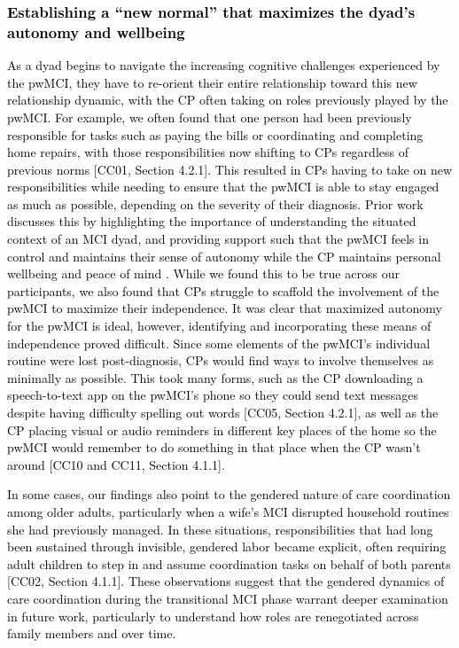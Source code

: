 \documentclass[acmsmall]{acmart}
\begin{document}
\textcolor{black}{\subsubsection{Establishing a “new normal” that maximizes the dyad’s autonomy and wellbeing}
As a dyad begins to navigate the increasing cognitive challenges \textcolor{black}{experienced by the pwMCI}, they have to re-orient their entire relationship toward this new relationship dynamic, with the CP often taking on roles previously played by the pwMCI. For example, we often found that one person had been previously responsible for tasks such as paying the bills or coordinating and completing home repairs, with those responsibilities now shifting to CPs regardless of previous norms \textcolor{black}{[CC01, Section 4.2.1]}. This resulted in CPs having to take on new responsibilities while needing to ensure that the pwMCI is able to stay engaged as much as possible, depending on the severity of their diagnosis. Prior work discusses this by highlighting the importance of understand\textcolor{black}{ing} the situated context of an MCI dyad, and provid\textcolor{black}{ing} support such that the pwMCI feels \textcolor{black}{in control and maintains their sense of autonomy} while the CP maintains personal wellbeing and peace of mind \cite{madjaroff2017narratives}. While we found this to be true across our participants, we also found that CPs struggle to scaffold the involvement of the pwMCI to maximize their independence. It was clear that maximized autonomy for the pwMCI is ideal, however, identifying and incorporating these means of independence proved difficult. Since some elements of the pwMCI’s individual routine were lost post-diagnosis, CPs would find ways to involve themselves as minimally as possible. This took many forms, such as the CP \textcolor{black}{downloading a speech-to-text app on the pwMCI’s phone so they could send text messages despite having difficulty spelling out words [CC05, Section 4.2.1], as well as} the CP placing visual \textcolor{black}{or audio} reminders in different key places of the home so the pwMCI would remember to do something in that place when the CP wasn’t around [CC10 \textcolor{black}{and CC11, Section 4.1.1}].} \textcolor{black}{In some cases, our findings also point to the gendered nature of care coordination among older adults, particularly when a wife’s MCI disrupted household routines she had previously managed. In these situations, responsibilities that had long been sustained through invisible, gendered labor became explicit, often requiring adult children to step in and assume coordination tasks on behalf of both parents [CC02\textcolor{black}{, Section 4.1.1}]. These observations suggest that the gendered dynamics of care coordination during the transitional MCI phase warrant deeper examination in future work, particularly to understand how roles are renegotiated across family members and over time.}
\end{document}
